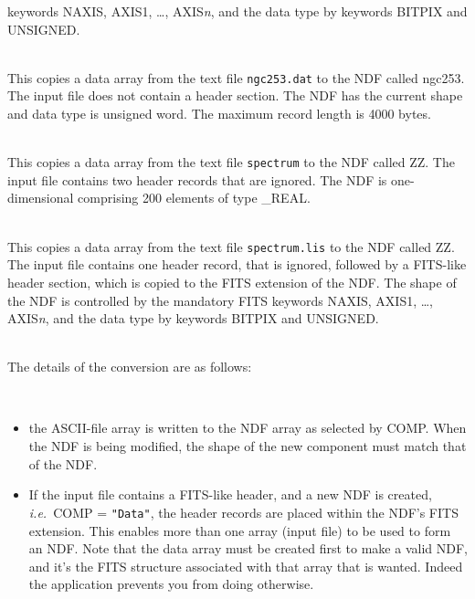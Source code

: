 \documentclass[twoside,11pt]{article}
\newcommand{\latex}[1]{#1}
\newlength{\sstexampleslength}
\newcommand{\sstexamplesubsection}[2]{\sloppy
\item[\parbox{\sstexampleslength}{\ssttt #1}] \mbox{} \vspace{0.5ex}
\\ #2 \vspace{1.0ex}}
\newcommand{\sstnotes}[1]{\pagebreak[3] \item[Notes:] \mbox{} \\[1.3ex] #1}
\newcommand{\ssthitemlist}[1]{
  \latex{
  \mbox{} \\
  \vspace{-3.5ex}
  }
  \begin{itemize}
     #1
  \end{itemize}
}
\newcommand{\sstitem}{\item}
\newcommand{\sstexamplesubsection}[2]{
   \vspace{-1.0ex} \item[{\ssttt #1}] #2 \vspace{0.2ex}}
\newcommand{\sstnotes}[1]{\item[Notes:]
      \begin{description}
         #1
      \end{description}
   }
\newcommand{\sstitem}{\item}
\begin{document}
{{{         keywords NAXIS, AXIS1, \dots, AXIS{\em{n}}, and the data type by
         keywords BITPIX and UNSIGNED.
      }
      \sstexamplesubsection{
         ascii2ndf type="\_uword" in=ngc253.dat out=ngc253 maxlen=4000 $\backslash$
      }{
         This copies a data array from the text file \texttt{ngc253.dat} to the
         NDF called ngc253.  The input file does not contain a header
         section.  The NDF has the current shape and data type is
         unsigned word.  The maximum record length is 4000 bytes.
      }
      \sstexamplesubsection{
         ascii2ndf spectrum ZZ skip=2 shape=200
      }{
         This copies a data array from the text file \texttt{spectrum} to
         the NDF called ZZ.  The input file contains two header records
         that are ignored.  The NDF is one-dimensional comprising 200
         elements of type \_REAL.
      }
      \sstexamplesubsection{
         ascii2ndf spectrum.lis ZZ skip=1 fits
      }{
         This copies a data array from the text file \texttt{spectrum.lis} to
         the NDF called ZZ.  The input file contains one header 
         record, that is ignored, followed by a FITS-like header section, which
         is copied to the FITS extension of the NDF.  The shape of the
         NDF is controlled by the mandatory FITS keywords NAXIS, AXIS1,
         \dots, AXIS{\em{n}}, and the data type by keywords BITPIX and UNSIGNED.
      }
   }
   \sstnotes{
      The details of the conversion are as follows:
      \ssthitemlist{

         \sstitem
            the ASCII-file array is written to the NDF array as
            selected by COMP.  When the NDF is being modified, the shape
            of the new component must match that of the NDF.

         \sstitem
            If the input file contains a FITS-like header, and a new
            NDF is created, {\it i.e.}\ COMP = \texttt{"Data"}, the header 
            records are placed within the NDF's FITS extension.  
            This enables more
            than one array (input file) to be used to form an NDF.  Note
            that the data array must be created first to make a valid NDF,
            and it's the FITS structure associated with that array that is
            wanted.  Indeed the application prevents you from doing
            otherwise.

}}}
\end{document}
